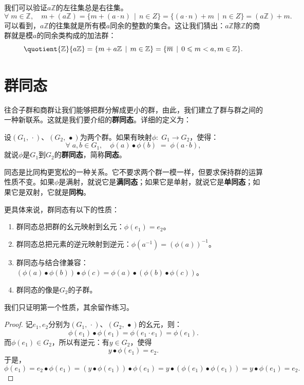 \documentclass[12pt,UTF8,fontset=none]{ctexbook}
\begin{document}
我们可以验证$a\mathbb{Z}$的左往集总是右往集。
$$ \forall \; m \in \mathbb{Z},\quad m + (a\mathbb{Z}) = \{m + (a\cdot n) \,\mid\, n \in Z\} = \{(a\cdot n) + m \,\mid\, n \in Z\} = (a\mathbb{Z}) + m. $$
可以看到，$a\mathbb{Z}$的往集就是所有模$a$同余的整数的集合。这让我们猜出：$a\mathbb{Z}$除$\mathbb{Z}$的商群就是模$a$的同余类构成的加法群：
$$ \quotient{\mathbb{Z}}{a\mathbb{Z}} = \{m + a\mathbb{Z}\,\mid\,m\in\mathbb{Z}\} = \{\overline{m} \,\mid\, 0\leqslant m < a,m\in\mathbb{Z}\}.$$

\section{群同态}

往合子群和商群让我们能够把群分解成更小的群，由此，我们建立了群与群之间的一种新联系。这就是我们要介绍的\textbf{群同态}。详细的定义为：
\begin{df}[群同态]
    设$(G_1,\,\cdot)$、$(G_2,\,\bullet)$为两个群。如果有映射$\phi:\;G_1\longrightarrow G_2$，使得：
    \[\forall\;a,b\in G_1,\quad \phi(a)\bullet \phi(b) \; = \; \phi(a \cdot b),\]
    就说$\phi$是$G_1$到$G_2$的\textbf{群同态}，简称\textbf{同态}。
\end{df}
同态是比同构更宽松的一种关系。它不要求两个群一模一样，但要求保持群的运算性质不变。如果$\phi$是满射，就说它是\textbf{满同态}；如果它是单射，就说它是\textbf{单同态}；如果它是双射，它就是\textbf{同构}。

更具体来说，群同态有以下的性质：
\begin{enumerate}
    \item 群同态总把群的幺元映射到幺元：$\phi(e_1) = e_2$。
    \item 群同态总把元素的逆元映射到逆元：$\phi(a^{-1}) = \left(\phi(a)\right)^{-1}$。
    \item 群同态与结合律兼容：$\left(\phi(a)\bullet \phi(b)\right)\bullet\phi(c) = \phi(a)\bullet\left(\phi(b)\bullet \phi(c)\right)$。
    \item 群同态的像是$G_2$的子群。
\end{enumerate}
我们只证明第一个性质，其余留作练习。
\begin{proof}
    记$e_1,e_2$分别为$(G_1,\,\cdot)$、$(G_2,\,\bullet)$的幺元，则：
    \[    \phi(e_1)\bullet\phi(e_1) = \phi(e_1\cdot e_1) = \phi(e_1).\]
    而$\phi(e_1)\in G_2$，所以有逆元：有$y\in G_2$，使得
    \[y\bullet\phi(e_1) = e_2.\]
    于是，
    \[\phi(e_1) = e_2\bullet\phi(e_1) = (y\bullet\phi(e_1))\bullet\phi(e_1) = y\bullet(\phi(e_1)\bullet\phi(e_1)) = y\bullet\phi(e_1) = e_2.\]
    
\end{proof}
\end{document}
